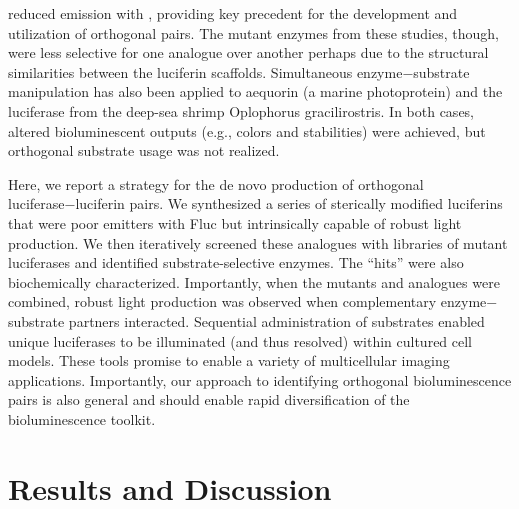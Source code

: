 reduced emission with \dluciferin{}, providing key precedent for
the development and utilization of orthogonal pairs.\cite{AdamsJr:2016bn} The
mutant enzymes from these studies, though, were less selective
for one analogue over another perhaps due to the structural
similarities between the luciferin scaffolds. Simultaneous enzyme−substrate manipulation has also been applied to
aequorin (a marine photoprotein) and the luciferase from the
deep-sea shrimp Oplophorus gracilirostris.\cite{Rowe:2009bd,Hall:2012cda} In both cases,
altered bioluminescent outputs (e.g., colors and stabilities) were
achieved, but orthogonal substrate usage was not realized.
\par
Here, we report a strategy for the de novo production of
orthogonal luciferase−luciferin pairs. We synthesized a series of
sterically modified luciferins that were poor emitters with Fluc
but intrinsically capable of robust light production. We then
iteratively screened these analogues with libraries of mutant
luciferases and identified substrate-selective enzymes. The
“hits” were also biochemically characterized. Importantly,
when the mutants and analogues were combined, robust light
production was observed when complementary enzyme−
substrate partners interacted. Sequential administration of
substrates enabled unique luciferases to be illuminated (and
thus resolved) within cultured cell models. These tools promise
to enable a variety of multicellular imaging applications.
Importantly, our approach to identifying orthogonal bioluminescence
pairs is also general and should enable rapid
diversification of the bioluminescence toolkit.

\section{Results and Discussion}

